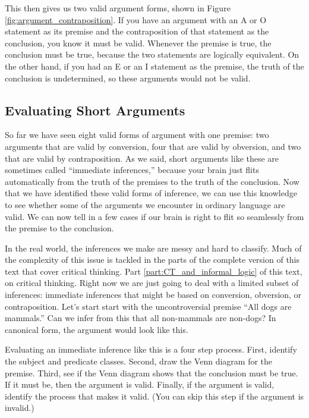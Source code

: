 This then gives us two valid argument forms, shown in Figure \ref{fig:argument_contraposition}. If you have an argument with an A or O statement as its premise and the contraposition of that statement as the conclusion, you know it must be valid. Whenever the premise is true, the conclusion must be true, because the two statements are logically equivalent. On the other hand, if you had an E or an I statement as the premise, the truth of the conclusion is undetermined, so these arguments would not be valid.

\subsection{Evaluating Short Arguments}
\label{sec:ESA}
So far we have seen eight valid forms of argument with one premise: two arguments that are valid by conversion, four that are valid by obversion, and two that are valid by contraposition. As we said, short arguments like these are sometimes called ``immediate inferences,'' because your brain just flits automatically from the truth of the premises to the truth of the conclusion. Now that we have identified these valid forms of inference, we can use this knowledge to see whether some of the arguments we encounter in ordinary language are valid. We can now tell in a few cases if our brain is right to flit so seamlessly from the premise to the conclusion.

In the real world, the inferences we make are messy and hard to classify. Much of the complexity of this issue is tackled in the parts of the complete version of this text that cover critical thinking. Part \ref{part:CT_and_informal_logic} of this text, on critical thinking. Right now we are just going to deal with a limited subset of inferences: immediate inferences that might be based on conversion, obversion, or contraposition. Let's start start with the uncontroversial premise ``All dogs are mammals.'' Can we infer from this that all non-mammals are non-dogs? In canonical form, the argument would look like this.

\begin{kormanize}
\end{kormanize}

Evaluating an immediate inference like this is a four step process. First, identify the subject and predicate classes. Second, draw the Venn diagram for the premise. Third, see if the Venn diagram shows that the conclusion must be true. If it must be, then the argument is valid. Finally, if the argument is valid, identify the process that makes it valid. (You can skip this step if the argument is invalid.)

